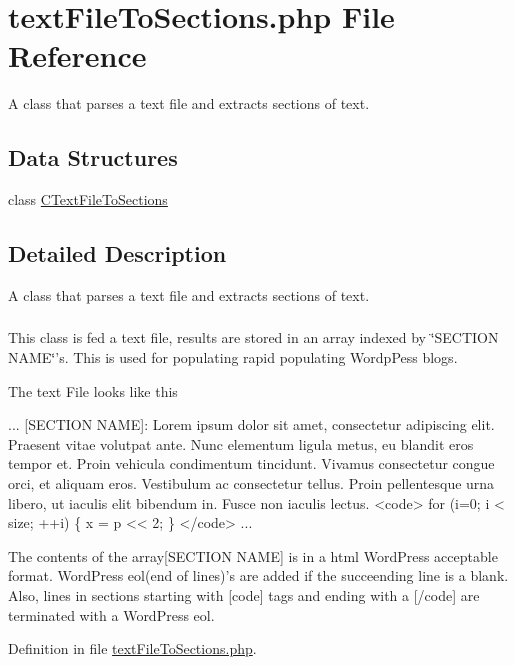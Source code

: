 \hypertarget{text_file_to_sections_8php}{\section{text\+File\+To\+Sections.\+php File Reference}
\label{text_file_to_sections_8php}
}


A class that parses a text file and extracts sections of text. \subsubsection*{} 


\subsection*{Data Structures}
\begin{DoxyCompactItemize}
\item 
class \hyperlink{class_c_text_file_to_sections}{C\+Text\+File\+To\+Sections}
\end{DoxyCompactItemize}


\subsection{Detailed Description}
A class that parses a text file and extracts sections of text. \subsubsection*{}



 



This class is fed a text file, results are stored in an array indexed by \char`\"{}\+S\+E\+C\+T\+I\+O\+N N\+A\+M\+E\char`\"{}'s. This is used for populating rapid populating Wordp\+Pess blogs.

The text File looks like this 
\begin{DoxyCode}
...
[SECTION NAME]:
Lorem ipsum dolor sit amet, consectetur adipiscing elit. 
Praesent vitae volutpat ante. Nunc elementum ligula metus, 
eu blandit eros tempor et. 
Proin vehicula condimentum tincidunt. Vivamus consectetur 
congue orci, et aliquam eros. 
Vestibulum ac consectetur tellus. 
Proin pellentesque urna libero, 
ut iaculis elit bibendum in. Fusce non iaculis lectus. 
<code>
\textcolor{keywordflow}{for} (i=0; i < size; ++i)
\{
    x = p << 2;
\}
</code>
...
\end{DoxyCode}


The contents of the array\mbox{[}S\+E\+C\+T\+I\+O\+N N\+A\+M\+E\mbox{]} is in a html Word\+Press acceptable format. Word\+Press eol(end of lines)'s are added if the succeending line is a blank. Also, lines in sections starting with \mbox{[}code\mbox{]} tags and ending with a \mbox{[}/code\mbox{]} are terminated with a Word\+Press eol.  

Definition in file \hyperlink{text_file_to_sections_8php_source}{text\+File\+To\+Sections.\+php}.

